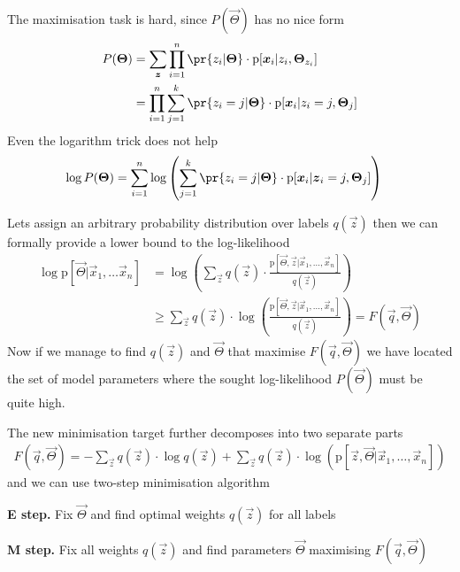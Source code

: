 \documentclass[landscape,footrule]{foils}
\newcommand{\pd}[1]{\mathrm{p}[#1]}
\begin{document}
The maximisation task is hard, since $P(\vec{\Theta})$ has no nice form 
\begin{align*}
P(\vec{\Theta})&=\sum_{\vec{z}}\prod_{i=1}^n\pr{z_i|\vec{\Theta}}\cdot
\pd{\vec{x}_i|z_i,\vec{\Theta}_{z_i}}\\
&=\prod_{i=1}^n\sum_{j=1}^k\pr{z_i=j|\vec{\Theta}}\cdot
\pd{\vec{x}_i|z_i=j,\vec{\Theta}_{j}}
\end{align*}
Even the logarithm trick does not help
\begin{align*}
\log P(\vec{\Theta})&=
\sum_{i=1}^n\log\left(\sum_{j=1}^k\pr{z_i=j|\vec{\Theta}}\cdot
\pd{\vec{x}_i|\vec{z}_i=j,\vec{\Theta}_{j}}\right)
\end{align*}


Lets assign an arbitrary probability distribution over labels $q(\vec{z})$ then we can formally provide a lower bound to the log-likelihood
\begin{align*}
\log \pd{\vec{\Theta}|\vec{x}_1,\ldots\vec{x}_n}%
&=\log\left(\sum_{\vec{z}}q(\vec{z})\cdot\frac{\pd{\vec{\Theta}, \vec{z}|\vec{x}_1,\ldots,\vec{x}_n}}{q(\vec{z})}\right)\\
&\geq \sum_{\vec{z}}q(\vec{z})\cdot\log\left(\frac{\pd{\vec{\Theta},\vec{z}|\vec{x}_1,\ldots,\vec{x}_n}}{q(\vec{z})}\right)=F(\vec{q},\vec{\Theta})
\end{align*}
Now if we manage to find $q(\vec{z})$ and $\vec{\Theta}$ that maximise $F(\vec{q},\vec{\Theta})$ we have located the set of model parameters where the sought log-likelihood $P(\vec{\Theta})$ must be quite high.


The new minimisation target further decomposes into two separate parts
\begin{align*}
F(\vec{q},\vec{\Theta})= -\sum_{\vec{z}}q(\vec{z})\cdot\log q(\vec{z})+
 \sum_{\vec{z}}q(\vec{z})\cdot\log\left(\pd{\vec{z},\vec{\Theta}|\vec{x}_1,\ldots,\vec{x}_n}\right)
\end{align*}
and we can use two-step minimisation algorithm
\vspace*{1cm}

\textbf{E step.} Fix $\vec{\Theta}$ and find optimal weights $q(\vec{z})$ for all labels

\textbf{M step.} Fix all weights $q(\vec{z})$ and find parameters $\vec{\Theta}$ maximising $F(\vec{q},\vec{\Theta})$


\end{document}
